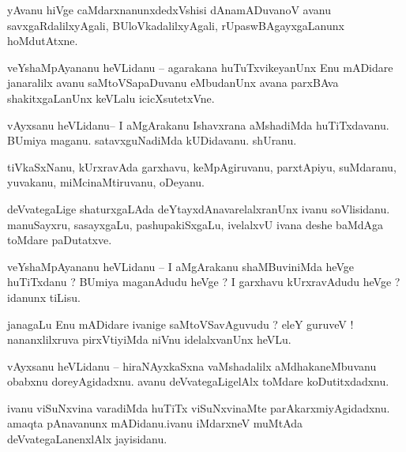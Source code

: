 \documentclass{article}
\begin{document}
\begin{mng}%
yAvanu hiVge caMdarxnanunxdedxVshisi dAnamADuvanoV avanu savxgaRdalilxyAgali, BUloVkadalilxyAgali, 
rUpaswBAgayxgaLanunx hoMdutAtxne.
\end{mng}


\begin{mng}%
veYshaMpAyananu heVLidanu -- agarakana huTuTxvikeyanUnx Enu mADidare janaralilx avanu 
saMtoVSapaDuvanu eMbudanUnx avana parxBAva shakitxgaLanUnx keVLalu icicXsutetxVne.
\end{mng}

\begin{mng}%
vAyxsanu heVLidanu-- I aMgArakanu Ishavxrana aMshadiMda huTiTxdavanu. BUmiya maganu. 
satavxguNadiMda kUDidavanu. shUranu.
\end{mng}

\begin{mng}%
tiVkaSxNanu, kUrxravAda garxhavu, keMpAgiruvanu, parxtApiyu, suMdaranu, yuvakanu, 
miMcinaMtiruvanu, oDeyanu.
\end{mng}

\begin{mng}%
deVvategaLige shaturxgaLAda deYtayxdAnavarelalxranUnx ivanu soVlisidanu. manuSayxru, sasayxgaLu, 
pashupakiSxgaLu, ivelalxvU ivana deshe baMdAga toMdare paDutatxve.
\end{mng}

\begin{mng}%
veYshaMpAyananu heVLidanu -- I aMgArakanu shaMBuviniMda heVge huTiTxdanu ? BUmiya maganAdudu heVge 
? I garxhavu kUrxravAdudu heVge ? idanunx tiLisu.
\end{mng}

\begin{mng}%
janagaLu Enu mADidare ivanige saMtoVSavAguvudu ? eleY guruveV ! nananxlilxruva pirxVtiyiMda niVnu 
idelalxvanUnx heVLu. 
\end{mng}

\begin{mng}%
vAyxsanu heVLidanu -- hiraNAyxkaSxna vaMshadalilx aMdhakaneMbuvanu obabxnu doreyAgidadxnu. avanu 
deVvategaLigelAlx toMdare koDutitxdadxnu.
\end{mng}

\begin{mng}%
ivanu viSuNxvina varadiMda huTiTx viSuNxvinaMte parAkarxmiyAgidadxnu. amaqta pAnavanunx 
mADidanu.ivanu iMdarxneV muMtAda deVvategaLanenxlAlx jayisidanu.
\end{mng}
\end{document}
